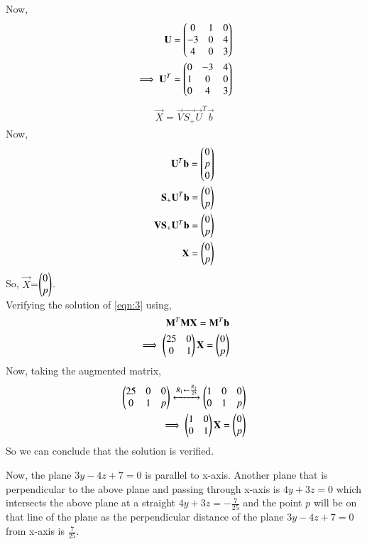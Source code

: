 \documentclass[journal,12pt,twocolumn]{IEEEtran}
\begin{document}
Now,
\begin{align}
\mathbf{U} = \begin{pmatrix}0 & 1 & 0\\-3 & 0 & 4\\4 & 0 & 3\end{pmatrix}\\
\implies \mathbf{U}^T = \begin{pmatrix}0 & -3 & 4\\1 & 0 & 0\\0 & 4 & 3\end{pmatrix}\\
\end{align}
\begin{align}
\vec{X} = \vec{V} \vec{S_+} \vec{U}^T \vec{b}
\end{align}
Now,
\begin{align}
\mathbf{U}^T \mathbf{b} = \begin{pmatrix}0\\p\\0\end{pmatrix}\\
\mathbf{S_+} \mathbf{U}^T \mathbf{b} = \begin{pmatrix}0\\ p\end{pmatrix}\\
\mathbf{V} \mathbf{S_+} \mathbf{U}^T \mathbf{b} = \begin{pmatrix}0 \\ p\end{pmatrix}\\
\mathbf{X}= \begin{pmatrix}0\\p\end{pmatrix}
\label{eqn:3}
\end{align}
So, $\vec{X}$=$\begin{pmatrix}0\\p\end{pmatrix}$.\\
Verifying the solution of \ref{eqn:3} using,
\begin{align}
\mathbf{M}^T \mathbf{M} \mathbf{X} = \mathbf{M}^T \mathbf{b}\\
\implies \begin{pmatrix}25 & 0\\0 & 1\end{pmatrix}\mathbf{X} = \begin{pmatrix}0\\p\end{pmatrix}
\end{align}
Now, taking the augmented matrix,
\begin{align}
\begin{pmatrix}25 & 0 & 0\\0 & 1 & p\end{pmatrix} \xleftrightarrow[]{R_1\leftarrow \frac{R_1}{25}}\begin{pmatrix}1 & 0 & 0\\0 & 1 & p\end{pmatrix}\\
\implies \begin{pmatrix}1 & 0\\0 & 1\end{pmatrix}\mathbf{X}=\begin{pmatrix}0\\p\end{pmatrix}
\end{align}
So we can conclude that the solution is verified.

Now, the plane $3y-4z+7 =0$ is parallel to x-axis. Another plane that is perpendicular to the above plane and passing through x-axis is $4y+3z=0$ which intersects the above plane at a straight $4y+3z=-\frac{7}{25}$ and the point $p$ will be on that line of the plane as the perpendicular distance of the plane $3y-4z+7 =0$ from x-axis is $\frac{7}{25}$.
\end{document}
